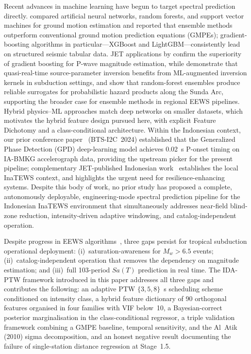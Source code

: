 \documentclass[10pt]{article}
\renewcommand{\cite}[1]{\citep{#1}}
\begin{document}
Recent advances in machine learning have begun to target spectral prediction directly. \citet{ref82} compared artificial neural networks, random forests, and support vector machines for ground motion estimation and reported that ensemble methods outperform conventional ground motion prediction equations (GMPEs); gradient-boosting algorithms in particular---XGBoost and LightGBM---consistently lead on structured seismic tabular data. JET applications by \citet{jetWang2024} confirm the superiority of gradient boosting for P-wave magnitude estimation, while \citet{jetMa2023} demonstrate that quasi-real-time source-parameter inversion benefits from ML-augmented inversion kernels in subduction settings, and \citet{jetTsunamiRF2025} show that random-forest ensembles produce reliable surrogates for probabilistic hazard products along the Sunda Arc, supporting the broader case for ensemble methods in regional EEWS pipelines. Hybrid physics--ML approaches match deep networks on smaller datasets, which motivates the hybrid feature design pursued here, with explicit Feature Dichotomy and a class-conditional architecture. Within the Indonesian context, our prior conference paper~\citet{ref81} (BTS-I2C~2024) established that the Generalized Phase Detection (GPD) deep-learning model achieves 0.02~s P-onset timing on IA-BMKG accelerograph data, providing the upstream picker for the present pipeline; complementary JET-published Indonesian work~\cite{jetSubekti2022, jetMukhlisin2023, jetIrwansyah2024} establishes the local InaTEWS context, and \citet{jetPribadi2023} highlights the urgent need for resilience-enhancing systems. Despite this body of work, no prior study has proposed a complete, autonomously deployable, engineering-mode spectral prediction pipeline for the Indonesian InaTEWS environment that simultaneously addresses near-field blind-zone reduction, intensity-driven adaptive windowing, and catalog-independent operation.

Despite progress in EEWS algorithms~\cite{ref18, ref19, jetCremen2021, jetTatar2025}, three gaps persist for tropical subduction operational deployment: (i)~saturation-awareness for $M_w > 6.5$ events; (ii)~catalog-independent operation that removes the dependency on magnitude estimation; and (iii)~full 103-period $Sa(T)$ prediction in real time. The IDA-PTW framework introduced in this paper addresses all three gaps and contributes the following: an adaptive PTW $\{3, 5, 8\}$~s scheduling scheme conditioned on intensity class, a hybrid feature dictionary of 90 orthogonal features organised in four families with VIF below~10, a Bayesian-correct posterior marginalisation in the class-conditional regressor, a triple validation framework combining a GMPE baseline, temporal sensitivity, and the Al~Atik (2010) sigma decomposition, and an honest negative result documenting the failure of single-station distance regression at Stage~1.5.
\end{document}

